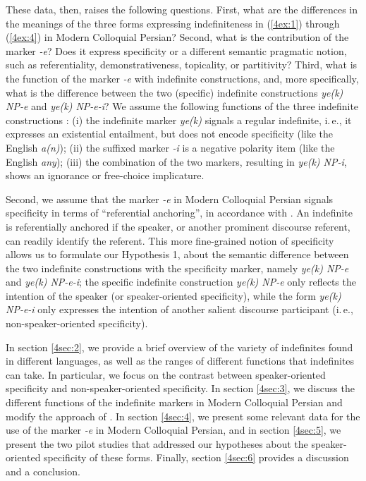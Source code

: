 \documentclass[output=paper]{langsci/langscibook}
\begin{document}
These data, then, raises the following questions. First, what are the differences in the meanings of the three forms expressing indefiniteness in (\ref{4ex:1}) through (\ref{4ex:4}) in Modern Colloquial Persian? Second, what is the contribution of the marker {\emph{-e}}? Does it express specificity or a different semantic pragmatic notion, such as referentiality, demonstrativeness, topicality, or partitivity? Third, what is the function of the marker {\emph{-e}} with indefinite constructions, and, more specifically, what is the difference between the two (specific) indefinite constructions {\emph{ye(k) NP-e}} and {\emph{ye(k) NP-e-i}}? We assume the following functions of the three indefinite constructions \citep[cf.][]{jasbi:14,lyons:99,windfuhr:79}: (i) the indefinite marker {\emph{ye(k)}} signals a regular indefinite, i.\,e., it expresses an existential entailment, but does not encode specificity (like the English {\emph{a(n)}}); (ii) the suffixed marker {\emph{-i}} is a negative polarity item (like the English {\emph{any}}); (iii) the combination of the two markers, resulting in {\emph{ye(k) NP-i}}, shows an ignorance or free-choice implicature.

\filbreak
Second, we assume that the marker {\emph{-e}} in Modern Colloquial Persian signals specificity in terms of ``referential anchoring'', in accordance with \cite{vonheus:02url}. An indefinite is referentially anchored if the speaker, or another prominent discourse referent, can readily identify the referent. This more fine-grained notion of specificity allows us to formulate our Hypothesis 1, about the semantic difference between the two indefinite constructions with the specificity marker, namely {\emph{ye(k) NP-e}} and {\emph{ye(k) NP-e-i}}; the specific indefinite construction {\emph{ye(k) NP-e}} only reflects the intention of the speaker (or speaker-oriented specificity), while the form {\emph{ye(k) NP-e-i}} only expresses the intention of another salient discourse participant (i.\,e., non-speaker-oriented specificity).

In section \ref{4sec:2}, we provide a brief overview of the variety of indefinites found in different languages, as well as the ranges of different functions that indefinites can take. In particular, we focus on the contrast between speaker-oriented specificity and non-speaker-oriented specificity. In section \ref{4sec:3}, we discuss the different functions of the indefinite markers in Modern Colloquial Persian and modify the approach of \cite{jasbi:16}. In section \ref{4sec:4}, we present some relevant data for the use of the marker {\emph{-e}} in Modern Colloquial Persian, and in section \ref{4sec:5}, we present the two pilot studies that addressed our hypotheses about the speaker-oriented specificity of these forms. Finally, section \ref{4sec:6} provides a discussion and a conclusion.
\end{document}
